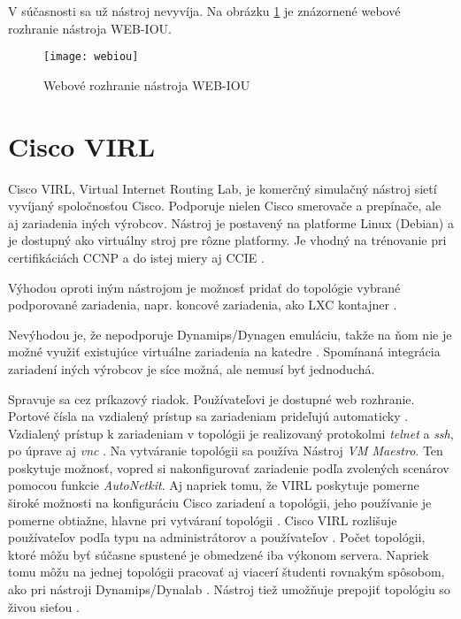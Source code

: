 V súčasnosti sa už nástroj nevyvíja. Na obrázku \ref{obr:webiou} je znázornené webové rozhranie nástroja WEB-IOU.

\begin{figure}
    \centering
    \texttt{[image: webiou]}
    \caption{Webové rozhranie nástroja WEB-IOU} \cite{obr_webiou}
    \label{obr:webiou}
\end{figure}





\section{Cisco VIRL}

Cisco VIRL, Virtual Internet Routing Lab, je komerčný simulačný nástroj sietí vyvíjaný spoločnosťou Cisco. Podporuje nielen Cisco smerovače a prepínače, ale aj zariadenia iných výrobcov. Nástroj je postavený na platforme Linux (Debian) a je dostupný ako virtuálny stroj pre rôzne platformy. Je vhodný na trénovanie pri certifikáciách CCNP a do istej miery aj CCIE \cite{virl_cisco}.

Výhodou oproti iným nástrojom je možnosť pridať do topológie vybrané podporované zariadenia, napr. koncové zariadenia, ako LXC kontajner \cite{virl_cisco}.

Nevýhodou je, že nepodporuje Dynamips/Dynagen emuláciu, takže na ňom nie je možné využiť existujúce virtuálne zariadenia na katedre \cite{virl_cisco}. Spomínaná integrácia zariadení iných výrobcov je síce možná, ale nemusí byť jednoduchá.

Spravuje sa cez príkazový riadok. Používateľovi je dostupné web rozhranie. Portové čísla na vzdialený prístup sa zariadeniam prideľujú automaticky \cite{virl_interfacett_1}. Vzdialený prístup k zariadeniam v topológii je realizovaný protokolmi \emph{telnet} a \emph{ssh}, po úprave aj \emph{vnc} \cite{virl_ciscoskills, virl_speaknetworks}. Na vytváranie topológii sa používa Nástroj \emph{VM Maestro}. Ten poskytuje možnosť, vopred si nakonfigurovať zariadenie podľa zvolených scenárov pomocou funkcie \emph{AutoNetkit}. Aj napriek tomu, že VIRL poskytuje pomerne široké možnosti na konfiguráciu Cisco zariadení a topológii, jeho používanie je pomerne obtiažne, hlavne pri vytváraní topológii \cite{virl_interfacett_1, virl_interfacett_2}. Cisco VIRL rozlišuje používateľov podľa typu na administrátorov a používateľov \cite{virl_cisco_features}. Počet topológii, ktoré môžu byť súčasne spustené je obmedzené iba výkonom servera. Napriek tomu môžu na jednej topológii pracovať aj viacerí študenti rovnakým spôsobom, ako pri nástroji Dynamips/Dynalab \cite{virl_interfacett_2}. Nástroj tiež umožňuje prepojiť topológiu so živou sieťou \cite{virl_speaknetworks}. 

